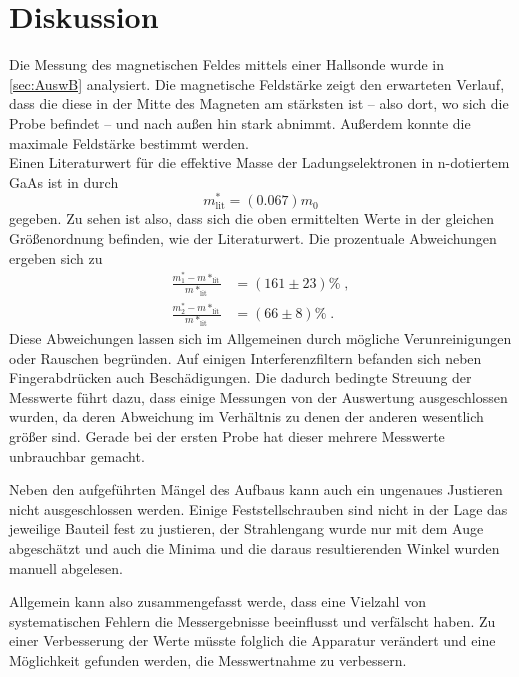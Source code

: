\section{Diskussion}
\label{sec:Diskussion}
Die Messung des magnetischen Feldes mittels einer Hallsonde wurde in \autoref{sec:AuswB} analysiert. Die magnetische Feldstärke zeigt den 
erwarteten Verlauf, dass die diese in der Mitte des Magneten am stärksten ist -- also dort, wo sich die Probe befindet -- und nach außen hin 
stark abnimmt. Außerdem konnte die maximale Feldstärke bestimmt werden. \\

Einen Literaturwert für die effektive Masse der Ladungselektronen in n-dotiertem GaAs ist in \cite{effM} durch 
\begin{equation*}
    m^*_\text{lit}= (0.067) m_0
\end{equation*}
gegeben. Zu sehen ist also, dass sich die oben ermittelten Werte in der gleichen Größenordnung befinden, wie der Literaturwert.
Die prozentuale Abweichungen ergeben sich zu
\begin{align*}
    \frac{m^*_1-m*_\text{lit}}{m*_\text{lit}}&=(161\pm 23) \%\; ,\\
    \frac{m^*_2-m*_\text{lit}}{m*_\text{lit}}&=(66\pm 8) \% \; .
\end{align*}
Diese Abweichungen lassen sich im Allgemeinen durch mögliche Verunreinigungen oder Rauschen begründen. Auf einigen Interferenzfiltern befanden sich neben Fingerabdrücken auch 
Beschädigungen. Die dadurch bedingte Streuung der Messwerte führt dazu, dass einige Messungen von der Auswertung ausgeschlossen wurden, da deren Abweichung im Verhältnis zu denen der anderen wesentlich größer
sind. Gerade bei der ersten Probe hat dieser mehrere Messwerte unbrauchbar gemacht.

Neben den aufgeführten Mängel des Aufbaus kann auch ein ungenaues Justieren nicht ausgeschlossen werden. Einige Feststellschrauben sind nicht in der Lage das jeweilige Bauteil fest zu justieren, der Strahlengang wurde nur mit dem Auge 
abgeschätzt und auch die Minima und die daraus resultierenden Winkel wurden manuell abgelesen.

Allgemein kann also zusammengefasst werde, dass eine Vielzahl von systematischen Fehlern die Messergebnisse beeinflusst und verfälscht haben. Zu einer Verbesserung der Werte müsste folglich 
die Apparatur verändert und eine Möglichkeit gefunden werden, die Messwertnahme zu verbessern.


